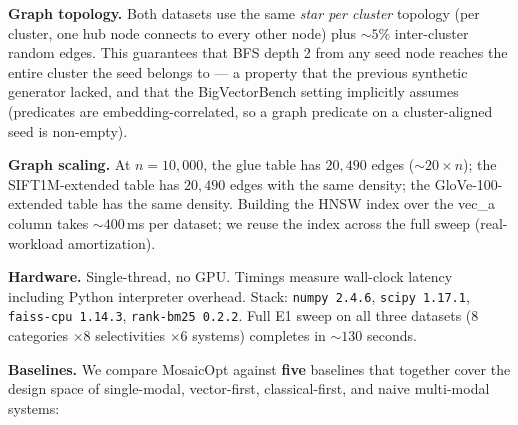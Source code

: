 \documentclass[sigconf,nonacm,review]{acmart}
\theoremstyle{plain}
\theoremstyle{definition}
\theoremstyle{remark}
\begin{document}
\textbf{Graph topology.} Both datasets use the same
\emph{star per cluster} topology (per cluster, one hub node
connects to every other node) plus $\sim 5\%$ inter-cluster
random edges.  This guarantees that BFS depth 2 from any seed
node reaches the entire cluster the seed belongs to --- a
property that the previous synthetic generator lacked, and
that the BigVectorBench setting implicitly assumes (predicates
are embedding-correlated, so a graph predicate on a
cluster-aligned seed is non-empty).

\textbf{Graph scaling.} At $n = 10{,}000$, the glue table has
$20{,}490$ edges ($\sim 20 \times n$); the SIFT1M-extended
table has $20{,}490$ edges with the same density; the
GloVe-100-extended table has the same density.  Building the
HNSW index over the vec\_a column takes $\sim 400$\,ms per
dataset; we reuse the index across the full sweep
(real-workload amortization).

\textbf{Hardware.} Single-thread, no GPU.  Timings measure
wall-clock latency including Python interpreter overhead.
Stack: \texttt{numpy 2.4.6}, \texttt{scipy 1.17.1},
\texttt{faiss-cpu 1.14.3}, \texttt{rank-bm25 0.2.2}.  Full E1
sweep on all three datasets ($8$ categories $\times 8$ selectivities
$\times 6$ systems) completes in $\sim 130$ seconds.

\textbf{Baselines.} We compare MosaicOpt against \textbf{five}
baselines that together cover the design space of single-modal,
vector-first, classical-first, and naive multi-modal systems:
\end{document}
